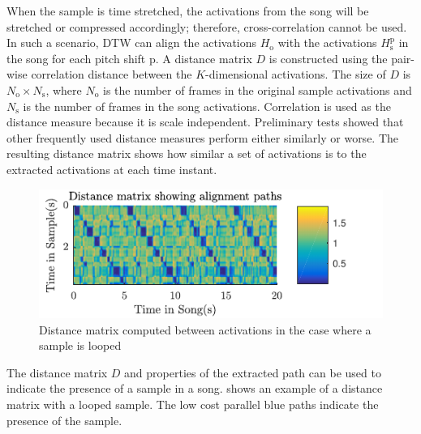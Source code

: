 \documentclass{article}
\begin{document}
When the sample is time stretched, the activations from the song will be stretched or compressed accordingly; therefore, cross-correlation cannot be used.
%
In such a scenario, DTW can align the activations $H_\mathrm{o}$ with the activations $H_{\mathrm{s}}^{\mathrm{p}}$ in the song for each pitch shift $\mathrm{p}$. A distance matrix $D$ is constructed using the pair-wise correlation distance between the $K$-dimensional activations. The size of $D$ is $N_\mathrm{o}\times N_\mathrm{s}$, where $N_\mathrm{o}$ is the number of frames in the original sample activations and $N_\mathrm{s}$ is the number of frames in the song activations. Correlation is used as the distance measure because it is scale independent. Preliminary tests showed that other frequently used distance measures perform either similarly or worse. The resulting distance matrix shows how similar a set of activations is to the extracted activations at each time instant.
\begin{figure}[t]
\centering
\includegraphics[width=\linewidth]{distmat.pdf}
\caption{Distance matrix computed between activations in the case where a sample is looped}
\label{fig2}
\end{figure}
The distance matrix $D$ and properties of the extracted path can be used to indicate the presence of a sample in a song.  shows an example of a distance matrix with a looped sample. The low cost parallel blue paths indicate the presence of the sample. 
\end{document}
